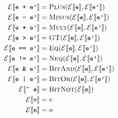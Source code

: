 
\usepackage{semantic}
\usepackage{textcomp}

\newcommand\bigstep{\ensuremath\Longrightarrow}



\begin{align*}
\eval{e + e'}{} &= \textsc{Plus}(\eval{e}{}, \eval{e'}{}) \\
\eval{e - e'}{} &= \textsc{Minus}(\eval{e}{}, \eval{e'}{}) \\
\eval{e * e'}{} &= \textsc{Mult}(\eval{e}{}, \eval{e'}{}) \\
\eval{e > e'}{} &= \textsc{GT}(\eval{e}{}, \eval{e'}{}) \\
\eval{e == e'}{} &= \textsc{Eq}(\eval{e}{}, \eval{e'}{}) \\
\eval{e != e'}{} &= \textsc{Neq}(\eval{e}{}, \eval{e'}{}) \\
\eval{e \& e'}{} &= \textsc{BitAnd}(\eval{e}{}, \eval{e'}{}) \\
\eval{e | e'}{} &= \textsc{BitOr}(\eval{e}{}, \eval{e'}{}) \\
\eval{\~{} e}{} &= \textsc{BitNot}(\eval{e}{}) \\
\eval{v}{} &= v \\
\eval{n}{} &= n \\
\end{align*}

